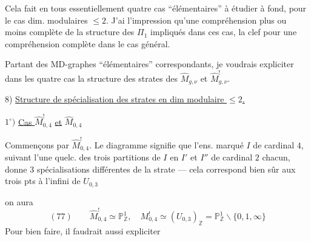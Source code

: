 Cela fait en tous essentiellement quatre cas ``élémentaires'' à étudier à fond, pour le cas  dim. modulaires $\leq2$. J'ai l'impression qu'une compréhension plus ou moins complète de la structure des $\Pi_1$  impliqués dans ces cas,  la clef pour une compréhension complète dans le cas général.

Partant des MD-graphes ``élémentaires'' correspondants, je voudrais expliciter dans les quatre cas la structure  des strates des $\widehat M_{g,\nu}$ et $\widehat M^!_{g,\nu}$.

8) \uline{Structure de spécialisation des strates en dim modulaire $\leq2$.}

$1^\circ)$ \uline{Cas } $\widehat M^!_{0,4}$ \uline{et} $\widehat M_{0,4}$

Commençons par $\widehat M^!_{0,4}$.
Le diagramme signifie que l'ens. marqué $I$ de cardinal $4$,  suivant l'une quelc. des trois partitions de $I$ en $I'$ et $I''$ de cardinal $2$ chacun, donne $3$ spécialisations différentes de la strate  --- cela correspond bien sûr aux trois pts à l'infini de $U_{0,3}$

on aura
\[
(77)\qquad \widehat M^!_{0,4}\simeq\mathbb P^1_{\mathbb Z},\quad M^!_{0,4}\simeq(U_{0,3})_{\mathbb Z}=\mathbb P^1_{\mathbb Z}\smallsetminus\{0,1,\infty\}
\]
Pour bien faire, il faudrait aussi expliciter

